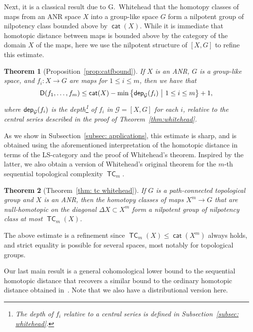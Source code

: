 \documentclass[amscd,amssymb,verbatim,10pt]{amsart}
\numberwithin{equation}{section}
\theoremstyle{plain}
\newtheorem{theorem}{Theorem}[section]
\theoremstyle{definition}
\DeclareMathOperator{\cat}{{\mathsf{cat}}}
\DeclareMathOperator{\TC}{{\mathsf{TC}}}
\newcommand{\cG}{{\mathcal{G}}}
\newcommand{\D}{{\sf {D}}}
\newcommand{\dep}{{\sf {dep}}}
\begin{document}
Next, it is a classical result due to G.~Whitehead that the homotopy classes of maps from an ANR space $X$ into a group-like space $G$ form 
a nilpotent group of nilpotency class bounded above by $\cat(X)$. While it is immediate that 
homotopic distance between maps is bounded above by the category of the domain $X$ of the maps, here we use the 
nilpotent structure of $[X,G]$ to refine this estimate. 

\begin{theorem}[Proposition~\ref{prop:catfbound}]
    If $X$ is an ANR, $G$ is a group-like space, and $f_i\colon X\to G$ are maps 
for $1\le i \le m$, then we have that
    \[
    \D(f_1,\dots,f_m)\le\cat(X)-\min\left\{\dep_{\cG}(f_i)\ \middle|\ 1\le i \le m\right\}    +1,
    \]
    where $\dep_{\cG}(f_i)$ is the depth\footnote{\hspace{0.5mm}The \emph{depth} of $f_i$ relative to a central series is defined in Subsection~\ref{subsec: whitehead}.} of $f_i$ in $\cG=[X,G]$ for each $i$, 
relative to the central series described in the proof of Theorem~\ref{thm:whitehead}.
\end{theorem}


As we show in Subsection~\ref{subsec: applications}, this estimate is sharp, and is obtained using the aforementioned interpretation of the homotopic distance in terms of the LS-category and the proof of Whitehead's theorem. Inspired by the latter, we also obtain a version of Whitehead's original theorem for the $m$-th sequential topological complexity $\TC_m$.


\begin{theorem}[Theorem~\ref{thm: tc whitehead}]
    If $G$ is a path-connected topological group and $X$ is an ANR, then the homotopy classes of maps $X^m\to G$ that are null-homotopic on the diagonal 
$\Delta X\subset X^m$ form a nilpotent group of nilpotency class at most $\TC_m(X)$.
\end{theorem}

The above estimate is a refinement since $\TC_m(X) \leq \cat(X^m)$ always holds, and strict equality is possible for several spaces, most notably for topological groups.

Our last main result is a general cohomological lower bound to the sequential homotopic distance that recovers a similar bound to the ordinary homotopic distance obtained in~\cite{MM}. Note that we also have a distributional version here.
\end{document}
